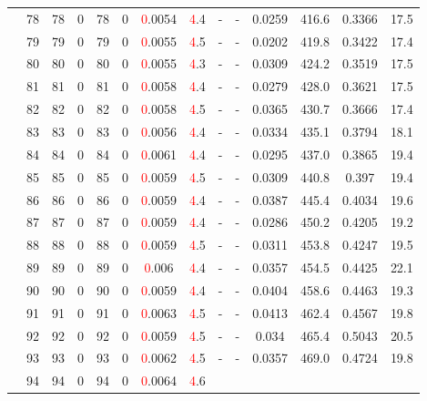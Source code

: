 \begin{table}[htb]
{\begin{tabular}{|c|c|c|c|c|c|c|c|c|c|c|c|c|c|}
 & 
78 & 78 & 0 & 78 & 0
 & \textcolor{red}0.0054 & \textcolor{red}4.4
 & - & -
 & 0.0259 & 416.6
 & 0.3366 & 17.5
 \\
 & 
79 & 79 & 0 & 79 & 0
 & \textcolor{red}0.0055 & \textcolor{red}4.5
 & - & -
 & 0.0202 & 419.8
 & 0.3422 & 17.4
 \\
 & 
80 & 80 & 0 & 80 & 0
 & \textcolor{red}0.0055 & \textcolor{red}4.3
 & - & -
 & 0.0309 & 424.2
 & 0.3519 & 17.5
 \\
 & 
81 & 81 & 0 & 81 & 0
 & \textcolor{red}0.0058 & \textcolor{red}4.4
 & - & -
 & 0.0279 & 428.0
 & 0.3621 & 17.5
 \\
 & 
82 & 82 & 0 & 82 & 0
 & \textcolor{red}0.0058 & \textcolor{red}4.5
 & - & -
 & 0.0365 & 430.7
 & 0.3666 & 17.4
 \\
 & 
83 & 83 & 0 & 83 & 0
 & \textcolor{red}0.0056 & \textcolor{red}4.4
 & - & -
 & 0.0334 & 435.1
 & 0.3794 & 18.1
 \\
 & 
84 & 84 & 0 & 84 & 0
 & \textcolor{red}0.0061 & \textcolor{red}4.4
 & - & -
 & 0.0295 & 437.0
 & 0.3865 & 19.4
 \\
 & 
85 & 85 & 0 & 85 & 0
 & \textcolor{red}0.0059 & \textcolor{red}4.5
 & - & -
 & 0.0309 & 440.8
 & 0.397 & 19.4
 \\
 & 
86 & 86 & 0 & 86 & 0
 & \textcolor{red}0.0059 & \textcolor{red}4.4
 & - & -
 & 0.0387 & 445.4
 & 0.4034 & 19.6
 \\
 & 
87 & 87 & 0 & 87 & 0
 & \textcolor{red}0.0059 & \textcolor{red}4.4
 & - & -
 & 0.0286 & 450.2
 & 0.4205 & 19.2
 \\
 & 
88 & 88 & 0 & 88 & 0
 & \textcolor{red}0.0059 & \textcolor{red}4.5
 & - & -
 & 0.0311 & 453.8
 & 0.4247 & 19.5
 \\
 & 
89 & 89 & 0 & 89 & 0
 & \textcolor{red}0.006 & \textcolor{red}4.4
 & - & -
 & 0.0357 & 454.5
 & 0.4425 & 22.1
 \\
 & 
90 & 90 & 0 & 90 & 0
 & \textcolor{red}0.0059 & \textcolor{red}4.4
 & - & -
 & 0.0404 & 458.6
 & 0.4463 & 19.3
 \\
 & 
91 & 91 & 0 & 91 & 0
 & \textcolor{red}0.0063 & \textcolor{red}4.5
 & - & -
 & 0.0413 & 462.4
 & 0.4567 & 19.8
 \\
 & 
92 & 92 & 0 & 92 & 0
 & \textcolor{red}0.0059 & \textcolor{red}4.5
 & - & -
 & 0.034 & 465.4
 & 0.5043 & 20.5
 \\
 & 
93 & 93 & 0 & 93 & 0
 & \textcolor{red}0.0062 & \textcolor{red}4.5
 & - & -
 & 0.0357 & 469.0
 & 0.4724 & 19.8
 \\
 & 
94 & 94 & 0 & 94 & 0
 & \textcolor{red}0.0064 & \textcolor{red}4.6

\end{tabular}}
\end{table}
